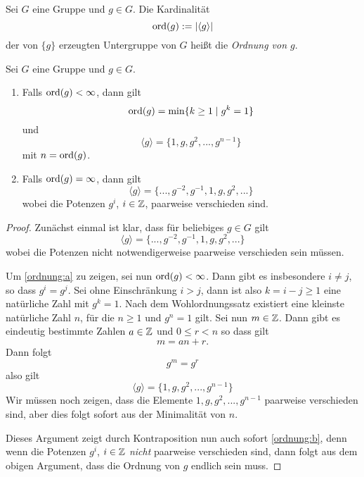 \documentclass{book}
\begin{document}
\begin{defi}
\label{defi:ordnung}
    Sei $G$ eine Gruppe und $g \in G$. Die Kardinalität
    \[
        \operatorname{ord}(g) := | \langle g \rangle |
    \]
    der von $\{g\}$ erzeugten Untergruppe von $G$ heißt die {\em Ordnung von $g$}. 
\end{defi}


\begin{prop}
    \label{prop:ordnung} Sei $G$ eine Gruppe und $g \in G$. 
    \begin{enumerate}
        \item\label{ordnung:a} Falls $\operatorname{ord}(g) < \infty$, dann gilt 
            \[
                \operatorname{ord}(g) = \min \{ k \geq 1 \; | \; g^k = 1 \}
            \]
            und 
            \[
                \langle g \rangle = \{ 1, g, g^2, ..., g^{n-1} \}
            \]
            mit $n = \operatorname{ord}(g)$. 
        \item\label{ordnung:b} Falls $\operatorname{ord}(g) = \infty$, dann gilt 
            \[
                \langle g \rangle = \{ ... , g^{-2}, g^{-1}, 1, g, g^2, ... \}
            \]
            wobei die Potenzen $g^i$, $i \in \mathbb{Z}$, paarweise verschieden sind. 
    \end{enumerate}
\end{prop}
\begin{proof}
    Zunächst einmal ist klar, dass für beliebiges $g \in G$ gilt
    \[
        \langle g \rangle = \{ ... , g^{-2}, g^{-1}, 1, g, g^2, ... \}
    \]
    wobei die Potenzen nicht notwendigerweise paarweise verschieden sein
    müssen. 

    Um \ref{ordnung:a} zu zeigen, sei nun $\operatorname{ord}(g) < \infty$. Dann gibt es
    insbesondere $i \neq j$, so dass $g^i = g^j$. Sei ohne Einschränkung $i >
    j$, dann ist also $k = i-j \geq 1$ eine natürliche Zahl mit $g^k = 1$. Nach
    dem Wohlordnungssatz existiert eine kleinste natürliche Zahl $n$, für die
    $n \geq 1 $ und $g^n = 1$ gilt. Sei nun $m \in \mathbb{Z}$. Dann gibt es eindeutig bestimmte
    Zahlen $a \in \mathbb{Z}$ und $0 \leq r < n$ so dass gilt
    \[
        m = a n + r.
    \]
    Dann folgt
    \[
        g^m = g^r
    \]
    also gilt
    \[
          \langle g \rangle = \{ 1, g, g^2, ..., g^{n-1} \}
    \]
    Wir müssen noch zeigen, dass die Elemente $1, g, g^2, ..., g^{n-1}$
    paarweise verschieden sind, aber dies folgt sofort aus der Minimalität von
    $n$. 

    Dieses Argument zeigt durch Kontraposition nun auch sofort \ref{ordnung:b}, denn wenn
    die Potenzen $g^i$, $i \in \mathbb{Z}$ {\em nicht} paarweise verschieden sind, dann folgt
    aus dem obigen Argument, dass die Ordnung von $g$ endlich sein muss. 
\end{proof}
\end{document}
